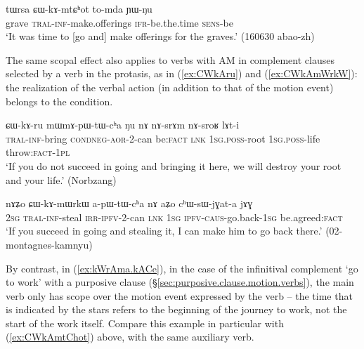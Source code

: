 \begin{exe}
\ex \label{ex:CWkAmtChot}
\gll tɯrsa ɕɯ-kɤ-mtɕʰot to-mda ɲɯ-ŋu \\
grave \textsc{tral}-\textsc{inf}-make.offerings \textsc{ifr}-be.the.time \textsc{sens}-be \\
\glt `It was time to [go and] make offerings for the graves.' (160630 abao-zh) 
 \end{exe} 
 
The same scopal effect also applies to  verbs with AM in complement clauses selected by a verb in the protasis, as in (\ref{ex:CWkAru}) and (\ref{ex:CWkAmWrkW}): the realization of the verbal action (in addition to that of the motion event) belongs to the condition.

\begin{exe}
\ex \label{ex:CWkAru}
\gll ɕɯ-kɤ-ru mɯ\redp{}mɤ-pɯ-tɯ-cʰa ŋu nɤ nɤ-srɤm nɤ-sroʁ lɤt-i \\
\textsc{tral}-\textsc{inf}-bring \textsc{cond}\redp{}\textsc{neg}-\textsc{aor}-2-can be:\textsc{fact} \textsc{lnk} \textsc{1sg}.\textsc{poss}-root \textsc{1sg}.\textsc{poss}-life throw:\textsc{fact}-\textsc{1pl} \\ 
\glt `If you do not succeed in going and bringing it here, we will destroy your root and your life.' (Norbzang)
\end{exe}

\begin{exe}
\ex \label{ex:CWkAmWrkW}
\gll nɤʑo ɕɯ-kɤ-mɯrkɯ a-pɯ-tɯ-cʰa nɤ aʑo cʰɯ-sɯ-jɣat-a jɤɣ \\
\textsc{2sg} \textsc{tral}-\textsc{inf}-steal \textsc{irr}-\textsc{ipfv}-2-can \textsc{lnk} \textsc{1sg} \textsc{ipfv}-\textsc{caus}-go.back-\textsc{1sg} be.agreed:\textsc{fact} \\
\glt `If you succeed in going and stealing it, I can make him to go back there.' (02-montagnes-kamnyu)
\end{exe}

 
By contrast, in  (\ref{ex:kWrAma.kACe}), in the case of the infinitival complement  `go to work' with a purposive clause  (§\ref{sec:purposive.clause.motion.verbs}), the main verb  only has scope over the motion event expressed by the verb  -- the time that is indicated by the stars refers to the beginning of the journey to work, not the start of the work itself. Compare this example in particular with (\ref{ex:CWkAmtChot}) above, with the same auxiliary verb.
 

